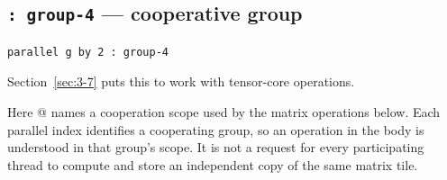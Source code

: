 \subsection*{\texttt{: group-4} --- cooperative group}

\begin{lstlisting}[language=croqtile,caption={: group-4 --- cooperative group}]
parallel g by 2 : group-4
\end{lstlisting}

Section~\ref{sec:3-7} puts this to work with tensor-core operations.

Here @ names a cooperation scope used by the matrix operations below. Each parallel index identifies a cooperating group, so an operation in the body is understood in that group's scope. It is not a request for every participating thread to compute and store an independent copy of the same matrix tile.
